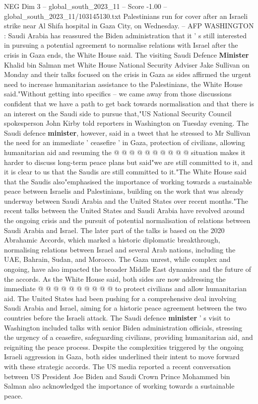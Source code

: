 \begin{textsample}{NEG Dim 3 – global\_south\_2023\_11 – Score -1.00 – global\_south\_2023\_11/103145130.txt}  \label{ex:f3_neg_105}
Palestinians run for cover after an Israeli strike near Al Shifa hospital in Gaza City, on Wednesday. -- AFP WASHINGTON : Saudi Arabia has reassured the Biden administration that it ' s still interested in pursuing a potential agreement to normalise relations with Israel after the crisis in Gaza ends, the White House said.
The visiting Saudi Defence \textbf{Minister} Khalid bin Salman met White House National Security Adviser Jake Sullivan on Monday and their talks focused on the crisis in Gaza as sides affirmed the urgent need to increase humanitarian assistance to the Palestinians, the White House said."Without getting into specifics -- we came away from those discussions confident that we have a path to get back towards normalisation and that there is an interest on the Saudi side to pursue that,"US National Security Council spokesperson John Kirby told reporters in Washington on Tuesday evening.
The Saudi defence \textbf{minister}, however, said in a tweet that he stressed to Mr Sullivan the need for an immediate ' ceasefire ' in Gaza, protection of civilians, allowing humanitarian aid and resuming the @ @ @ @ @ @ @ @ @ @ situation makes it harder to discuss long-term peace plans but said"we are still committed to it, and it is clear to us that the Saudis are still committed to it."The White House said that the Saudis also"emphasised the importance of working towards a sustainable peace between Israelis and Palestinians, building on the work that was already underway between Saudi Arabia and the United States over recent months."The recent talks between the United States and Saudi Arabia have revolved around the ongoing crisis and the pursuit of potential normalisation of relations between Saudi Arabia and Israel.
The later part of the talks is based on the 2020 Abrahamic Accords, which marked a historic diplomatic breakthrough, normalising relations between Israel and several Arab nations, including the UAE, Bahrain, Sudan, and Morocco.
The Gaza unrest, while complex and ongoing, have also impacted the broader Middle East dynamics and the future of the accords.
As the White House said, both sides are now addressing the immediate @ @ @ @ @ @ @ @ @ @ to protect civilians and allow humanitarian aid.
The United States had been pushing for a comprehensive deal involving Saudi Arabia and Israel, aiming for a historic peace agreement between the two countries before the Israeli attack.
The Saudi defence \textbf{minister} ' s visit to Washington included talks with senior Biden administration officials, stressing the urgency of a ceasefire, safeguarding civilians, providing humanitarian aid, and reigniting the peace process.
Despite the complexities triggered by the ongoing Israeli aggression in Gaza, both sides underlined their intent to move forward with these strategic accords.
The US media reported a recent conversation between US President Joe Biden and Saudi Crown Prince Mohammed bin Salman also acknowledged the importance of working towards a sustainable peace.

\end{textsample}
